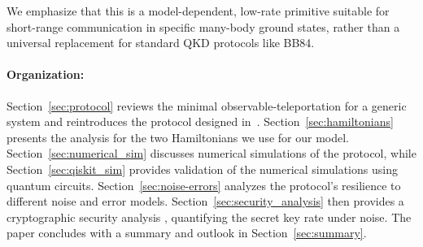 We emphasize that this is a model-dependent, low-rate primitive suitable for short-range communication in specific many-body ground states, rather than a universal replacement for standard QKD protocols like BB84.

\paragraph{Organization:} Section~\ref{sec:protocol} reviews the minimal observable-teleportation for a generic system and reintroduces the protocol designed in~\cite{QKDbyQET}. Section~\ref{sec:hamiltonians} presents the analysis for the two Hamiltonians we use for our model. Section~\ref{sec:numerical_sim} discusses numerical simulations of the protocol, while Section~\ref{sec:qiskit_sim} provides validation of the numerical simulations using quantum circuits. Section~\ref{sec:noise-errors} analyzes the protocol's resilience to different noise and error models. Section~\ref{sec:security_analysis} then provides a cryptographic security analysis \cite{Renner2005}, quantifying the secret key rate under noise. The paper concludes with a summary and outlook in Section~\ref{sec:summary}.
